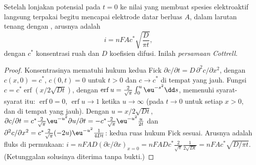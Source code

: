 \begin{theorem}\label{thm:b3:electrode-kinetics:cottrell}
Setelah lonjakan potensial pada $t = 0$ ke nilai yang membuat spesies
elektroaktif langsung terpakai begitu mencapai elektrode datar berluas $A$,
dalam larutan tenang dengan , arusnya adalah
\[
  i = nFAc^*\sqrt{\frac{D}{\pi t}},
\]
dengan $c^*$ konsentrasi ruah dan $D$ koefisien difusi. Inilah
\emph{persamaan Cottrell}.
\end{theorem}

\begin{proof}
Konsentrasinya mematuhi hukum kedua Fick $\partial c/\partial t = D\,\partial^2c/\partial x^2$,
dengan $c(x, 0) = c^*$,
$c(0, t) = 0$ untuk $t > 0$ dan $c \to c^*$ di tempat yang jauh. Fungsi
$c = c^*\operatorname{erf}(x/2\sqrt{Dt})$, dengan
$\operatorname{erf}u = \frac{2}{\sqrt\pi}\int_0^u\eu^{-s^2}\dd s$, memenuhi syarat-syarat itu:
$\operatorname{erf}0 = 0$, $\operatorname{erf}u \to 1$ ketika $u \to \infty$
(pada $t \to 0$ untuk setiap $x > 0$, dan di tempat yang jauh). Dengan
$u = x/2\sqrt{Dt}$,
$\partial c/\partial t = c^*\frac{2}{\sqrt\pi}\eu^{-u^2}\partial u/\partial t = -c^*\frac{2}{\sqrt\pi}\eu^{-u^2}\frac{u}{2t}$
dan $\partial^2c/\partial x^2 = c^*\frac{2}{\sqrt\pi}(-2u)\eu^{-u^2}\frac{1}{4Dt}$: kedua ruas
hukum Fick sesuai. Arusnya adalah fluks di permukaan: $i =
nFAD(\partial c/\partial x)_{x = 0} = nFADc^*\frac{2}{\sqrt\pi}\frac{1}{2\sqrt{Dt}} = nFAc^*\sqrt{D/\pi t}$.
(Ketunggalan solusinya diterima tanpa bukti.)
\end{proof}

